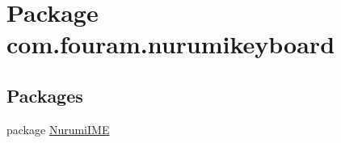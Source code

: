\hypertarget{namespacecom_1_1fouram_1_1nurumikeyboard}{}\section{Package com.\+fouram.\+nurumikeyboard}
\label{namespacecom_1_1fouram_1_1nurumikeyboard}
\subsection*{Packages}
\begin{DoxyCompactItemize}
\item 
package \hyperlink{namespacecom_1_1fouram_1_1nurumikeyboard_1_1_nurumi_i_m_e}{Nurumi\+I\+M\+E}
\end{DoxyCompactItemize}
